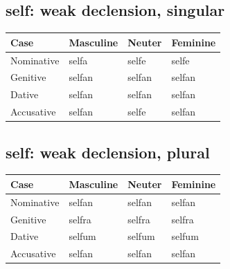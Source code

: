\subsection*{self: weak declension, singular}

\par\begingroup
\fontsize{10.5}{13.2}\selectfont
\setlength{\LTleft}{0pt}\setlength{\LTright}{\fill}
\noindent
\begin{tabular}{@{}>{\raggedright\arraybackslash}p{28.89mm}>{\raggedright\arraybackslash}p{28.89mm}>{\raggedright\arraybackslash}p{28.89mm}>{\raggedright\arraybackslash}p{28.89mm}@{}}
\toprule
\textbf{Case} & \textbf{Masculine} & \textbf{Neuter} & \textbf{Feminine} \\
\midrule
Nominative & selfa & selfe & selfe \\
Genitive & selfan & selfan & selfan \\
Dative & selfan & selfan & selfan \\
Accusative & selfan & selfe & selfan \\
\bottomrule
\end{tabular}
\par\endgroup

\subsection*{self: weak declension, plural}

\par\begingroup
\fontsize{10.5}{13.2}\selectfont
\setlength{\LTleft}{0pt}\setlength{\LTright}{\fill}
\noindent
\begin{tabular}{@{}>{\raggedright\arraybackslash}p{28.89mm}>{\raggedright\arraybackslash}p{28.89mm}>{\raggedright\arraybackslash}p{28.89mm}>{\raggedright\arraybackslash}p{28.89mm}@{}}
\toprule
\textbf{Case} & \textbf{Masculine} & \textbf{Neuter} & \textbf{Feminine} \\
\midrule
Nominative & selfan & selfan & selfan \\
Genitive & selfra & selfra & selfra \\
Dative & selfum & selfum & selfum \\
Accusative & selfan & selfan & selfan \\
\bottomrule
\end{tabular}
\par\endgroup

